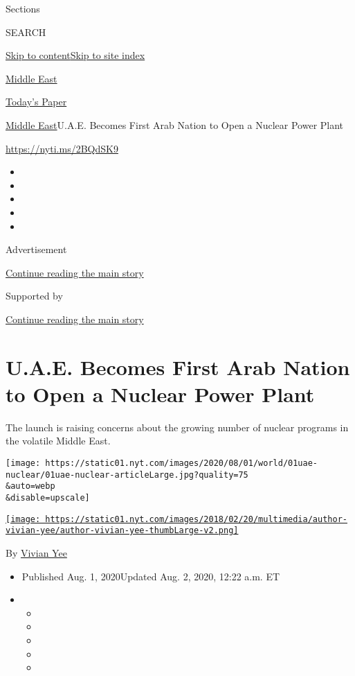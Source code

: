 Sections

SEARCH

\protect\hyperlink{site-content}{Skip to
content}\protect\hyperlink{site-index}{Skip to site index}

\href{https://www.nytimes.com/section/world/middleeast}{Middle East}

\href{https://myaccount.nytimes.com/auth/login?response_type=cookie\&client_id=vi}{}

\href{https://www.nytimes.com/section/todayspaper}{Today's Paper}

\href{/section/world/middleeast}{Middle East}\textbar{}U.A.E. Becomes
First Arab Nation to Open a Nuclear Power Plant

\url{https://nyti.ms/2BQdSK9}

\begin{itemize}
\item
\item
\item
\item
\item
\end{itemize}

Advertisement

\protect\hyperlink{after-top}{Continue reading the main story}

Supported by

\protect\hyperlink{after-sponsor}{Continue reading the main story}

\hypertarget{uae-becomes-first-arab-nation-to-open-a-nuclear-power-plant}{%
\section{U.A.E. Becomes First Arab Nation to Open a Nuclear Power
Plant}\label{uae-becomes-first-arab-nation-to-open-a-nuclear-power-plant}}

The launch is raising concerns about the growing number of nuclear
programs in the volatile Middle East.

\texttt{[image: https://static01.nyt.com/images/2020/08/01/world/01uae-nuclear/01uae-nuclear-articleLarge.jpg?quality=75\\\&auto=webp\\\&disable=upscale]}

\href{https://www.nytimes.com/by/vivian-yee}{\texttt{[image: https://static01.nyt.com/images/2018/02/20/multimedia/author-vivian-yee/author-vivian-yee-thumbLarge-v2.png]}}

By \href{https://www.nytimes.com/by/vivian-yee}{Vivian Yee}

\begin{itemize}
\item
  Published Aug. 1, 2020Updated Aug. 2, 2020, 12:22 a.m. ET
\item
  \begin{itemize}
  \item
  \item
  \item
  \item
  \item
  \end{itemize}
\end{itemize}

